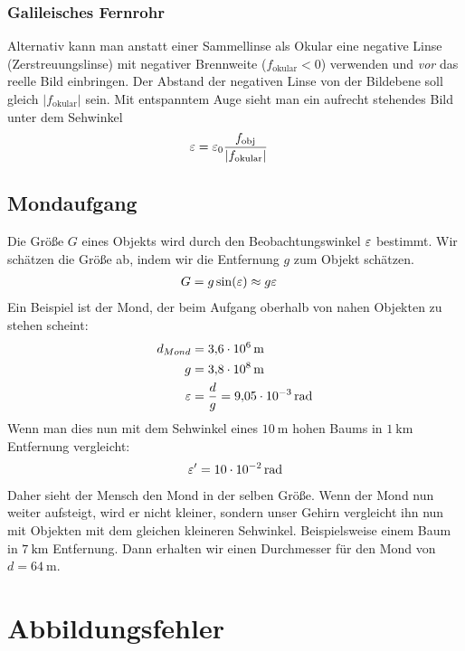 \subsubsection{Galileisches Fernrohr}
Alternativ kann man anstatt einer Sammellinse als Okular eine negative
Linse (Zerstreuungslinse) mit negativer Brennweite ($f_\text{okular}<0$)
verwenden und \emph{vor} das reelle Bild einbringen. Der Abstand der
negativen Linse von der Bildebene soll gleich $\vert f_\text{okular}\vert$
sein.
Mit entspanntem Auge sieht man ein aufrecht stehendes Bild unter dem
Sehwinkel
\begin{align*}
  \varepsilon &= \varepsilon_0\frac{f_\text{obj}}{\vert f_\text{okular}\vert}
\end{align*}

\subsection{Mondaufgang}
Die Größe $G$ eines Objekts wird durch den Beobachtungswinkel $\varepsilon$ bestimmt.
Wir schätzen die Größe ab, indem wir die Entfernung $g$ zum Objekt schätzen.
\begin{align*}
  G &= g\sin(\varepsilon)\approx g\varepsilon
\end{align*}
Ein Beispiel ist der Mond, der beim Aufgang oberhalb von nahen Objekten zu
stehen scheint:
\begin{align*}
  d_{Mond} &= \SI{3,6e6}{\meter}\\
  g &= \SI{3,8e8}{\meter}\\
  \varepsilon &= \frac{d}{g}=\SI{9,05e-3}{\radian}
\end{align*}
Wenn man dies nun mit dem Sehwinkel eines $\SI{10}{\meter}$ hohen
Baums in $\SI{1}{\kilo\meter}$ Entfernung vergleicht:
\begin{align*}
  \varepsilon^\prime = \SI{10e-2}{\radian}
\end{align*}
Daher sieht der Mensch den Mond in der selben Größe. Wenn der Mond nun
weiter aufsteigt, wird er nicht kleiner, sondern unser Gehirn
vergleicht ihn nun mit Objekten mit dem gleichen kleineren
Sehwinkel. Beispielsweise einem Baum in $\SI{7}{\kilo\meter}$
Entfernung. Dann erhalten wir einen Durchmesser für den Mond von
$d=\SI{64}{\meter}$.

\section{Abbildungsfehler}
